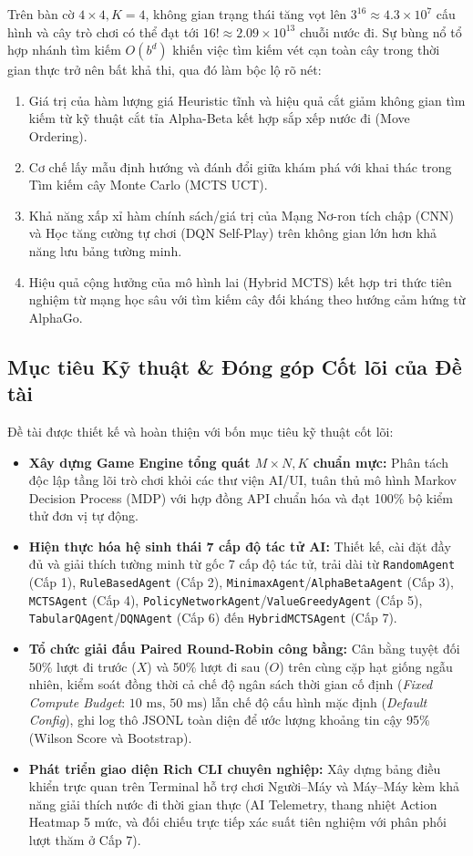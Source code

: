 \documentclass[a4paper,12pt]{report}
\begin{document}
Trên bàn cờ $4 \times 4, K=4$, không gian trạng thái tăng vọt lên $3^{16} \approx 4.3 \times 10^7$ cấu hình và cây trò chơi có thể đạt tới $16! \approx 2.09 \times 10^{13}$ chuỗi nước đi. Sự bùng nổ tổ hợp nhánh tìm kiếm $O(b^d)$ khiến việc tìm kiếm vét cạn toàn cây trong thời gian thực trở nên bất khả thi, qua đó làm bộc lộ rõ nét:
\begin{enumerate}[leftmargin=1.2cm]
    \item Giá trị của hàm lượng giá Heuristic tĩnh và hiệu quả cắt giảm không gian tìm kiếm từ kỹ thuật cắt tỉa Alpha-Beta kết hợp sắp xếp nước đi (Move Ordering).
    \item Cơ chế lấy mẫu định hướng và đánh đổi giữa khám phá với khai thác trong Tìm kiếm cây Monte Carlo (MCTS UCT).
    \item Khả năng xấp xỉ hàm chính sách/giá trị của Mạng Nơ-ron tích chập (CNN) và Học tăng cường tự chơi (DQN Self-Play) trên không gian lớn hơn khả năng lưu bảng tường minh.
    \item Hiệu quả cộng hưởng của mô hình lai (Hybrid MCTS) kết hợp tri thức tiên nghiệm từ mạng học sâu với tìm kiếm cây đối kháng theo hướng cảm hứng từ AlphaGo.
\end{enumerate}

\subsection{Mục tiêu Kỹ thuật \& Đóng góp Cốt lõi của Đề tài}
Đề tài được thiết kế và hoàn thiện với bốn mục tiêu kỹ thuật cốt lõi:
\begin{itemize}[leftmargin=1.2cm]
    \item \textbf{Xây dựng Game Engine tổng quát $M \times N, K$ chuẩn mực:} Phân tách độc lập tầng lõi trò chơi khỏi các thư viện AI/UI, tuân thủ mô hình Markov Decision Process (MDP) với hợp đồng API chuẩn hóa và đạt 100\% bộ kiểm thử đơn vị tự động.
    \item \textbf{Hiện thực hóa hệ sinh thái 7 cấp độ tác tử AI:} Thiết kế, cài đặt đầy đủ và giải thích tường minh từ gốc 7 cấp độ tác tử, trải dài từ \texttt{RandomAgent} (Cấp 1), \texttt{RuleBasedAgent} (Cấp 2), \texttt{MinimaxAgent}/\texttt{AlphaBetaAgent} (Cấp 3), \texttt{MCTSAgent} (Cấp 4), \texttt{PolicyNetworkAgent}/\texttt{ValueGreedyAgent} (Cấp 5), \texttt{TabularQAgent}/\texttt{DQNAgent} (Cấp 6) đến \texttt{HybridMCTSAgent} (Cấp 7).
    \item \textbf{Tổ chức giải đấu Paired Round-Robin công bằng:} Cân bằng tuyệt đối 50\% lượt đi trước ($X$) và 50\% lượt đi sau ($O$) trên cùng cặp hạt giống ngẫu nhiên, kiểm soát đồng thời cả chế độ ngân sách thời gian cố định (\textit{Fixed Compute Budget}: $10\text{ ms}$, $50\text{ ms}$) lẫn chế độ cấu hình mặc định (\textit{Default Config}), ghi log thô JSONL toàn diện để ước lượng khoảng tin cậy 95\% (Wilson Score và Bootstrap).
    \item \textbf{Phát triển giao diện Rich CLI chuyên nghiệp:} Xây dựng bảng điều khiển trực quan trên Terminal hỗ trợ chơi Người--Máy và Máy--Máy kèm khả năng giải thích nước đi thời gian thực (AI Telemetry, thang nhiệt Action Heatmap 5 mức, và đối chiếu trực tiếp xác suất tiên nghiệm với phân phối lượt thăm ở Cấp 7).
\end{itemize}
\end{document}

